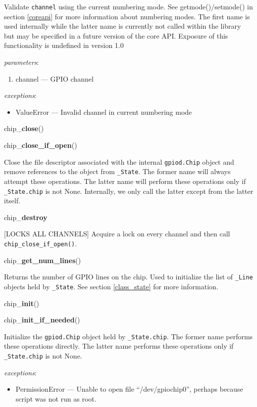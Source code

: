 \documentclass[12pt]{article}
\begin{document}
Validate \texttt{channel} using the current numbering mode. See getmode()/setmode() in section \ref{coreapi} for more information about numbering modes. The first name is used internally while the latter name is currently not called within the library but may be specified in a future version of the core API. Exposure of this functionality is undefined in version 1.0

\textit{parameters}:
\begin{enumerate}      
        \item channel --- GPIO channel
\end{enumerate}
 
 
\textit{exceptions}:
\begin{itemize}
    \item ValueError --- Invalid channel in current numbering mode
\end{itemize}

\noindent chip\_\textbf{close}()

\noindent chip\_\textbf{close\_if\_open}()

Close the file descriptor associated with the internal \texttt{gpiod.Chip} object and remove references to the object from \texttt{\_State}. The former name will always attempt these operations. The latter name will perform these operations only if \texttt{\_State.chip} is not None. Internally, we only call the latter except from the latter itself.

\noindent chip\_\textbf{destroy}

[LOCKS ALL CHANNELS] Acquire a lock on every channel and then call \texttt{chip\_close\_if\_open()}.

\noindent chip\_\textbf{get\_num\_lines}()

Returns the number of GPIO lines on the chip. Used to initialize the list of \texttt{\_Line} objects held by \texttt{\_State}. See section \ref{class_state} for more information.

\noindent chip\_\textbf{init}()

\noindent chip\_\textbf{init\_if\_needed}()

Initialize the \texttt{gpiod.Chip} object held by \texttt{\_State.chip}. The former name performs these operations directly. The latter name performs these operations only if \texttt{\_State.chip} is not None.

\textit{exceptions}:
\begin{itemize}
    \item PermissionError --- Unable to open file ``/dev/gpiochip0'', perhaps because script was not run as root.
\end{itemize}
\end{document}
